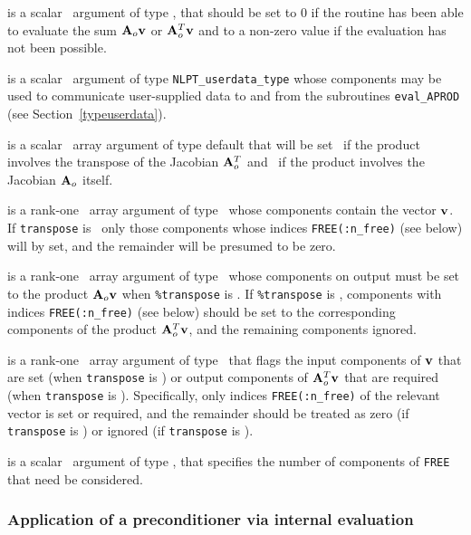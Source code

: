 \documentclass{galahad}
\begin{document}
\begin{description}
 is a scalar \intentout\ argument of type \integer,
that should be set to 0 if the routine has been able to evaluate the
sum ${\mathbf{A}}_o {\mathbf{v}}$ or ${\mathbf{A}}_o^T{\mathbf{v}}$
and to a non-zero value if the evaluation has not been possible.

 is a scalar \intentinout\ argument of type
{\tt NLPT\_userdata\_type} whose components may be used
to communicate user-supplied data to and from the subroutines
{\tt eval\_APROD}
(see Section~\ref{typeuserdata}).

 is a scalar \intentin\ array argument of type
default that will be set \true\ if the product involves the transpose
of the Jacobian ${\mathbf{A}}_o^T$ and \false\ if the product involves
the Jacobian ${\mathbf{A}}_o$ itself.

 is a rank-one \intentin\ array argument of type \realdp\
whose components contain the vector ${\mathbf{v}}$. If {\tt transpose} is \false\
only those components whose indices {\tt FREE(:n\_free)} (see below)
will by set, and the remainder will be presumed to be zero.

 is a rank-one \intentout\ array argument of type \realdp\
whose components on output must be set to the
product ${\mathbf{A}}_o {\mathbf{v}}$ when {\tt \%transpose} is \false. If
{\tt \%transpose} is \true, components with indices {\tt FREE(:n\_free)}
(see below) should be set to the corresponding components of the
product ${\mathbf{A}}_o^T {\mathbf{v}}$, and the remaining components ignored.

\itt{FREE} is a rank-one \intentin\ array argument of
type \integer\ that flags the input components of ${\mathbf{v}}$ that are set
(when {\tt transpose} is \false) or output components of ${\mathbf{A}}_o^T {\mathbf{v}}$ that
are required (when {\tt transpose} is \true). Specifically, only indices
{\tt FREE(:n\_free)} of the relevant vector is set or required, and the
remainder should be treated as zero (if {\tt transpose} is \false)
or ignored  (if {\tt transpose} is \true).

\itt{n\_free} is a scalar \intentin\ argument of type \integer,
that specifies the number of components of {\tt FREE} that need be considered.

\end{description}


\subsubsection{Application of a preconditioner via internal evaluation
\label{prec}}
\end{document}
